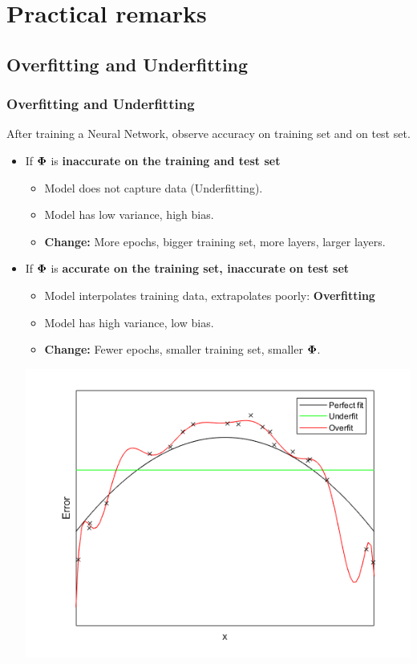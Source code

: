 \documentclass[10pt,hyperref={pdfpagelabels=false}]{beamer}
\begin{document}
\section{Practical remarks}
\subsection{Overfitting and Underfitting}
\begin{frame}[allowframebreaks]
    \frametitle{Overfitting and Underfitting}
    After training a Neural Network, observe accuracy on training set and on test set.
    \begin{itemize}
        \item If $\boldsymbol{\Phi}$ is {\bf inaccurate on the training and test set}
        \begin{itemize}
            \item Model does not capture data (Underfitting).
            \item Model has low variance, high bias.
            \item {\bf Change:} More epochs, bigger training set, more layers, larger layers.
        \end{itemize}
        \item If $\boldsymbol{\Phi}$ is {\bf accurate on the training set, inaccurate on test set}
        \begin{itemize}
            \item Model interpolates training data, extrapolates poorly: {\bf Overfitting}
            \item Model has high variance, low bias.
            \item {\bf Change:} Fewer epochs, smaller training set, smaller $\boldsymbol{\Phi}$.
        \end{itemize}
    \framebreak
    \includegraphics[width=.9\textwidth]{figures/overunder1.png}

\end{itemize}
\end{frame}
\end{document}
